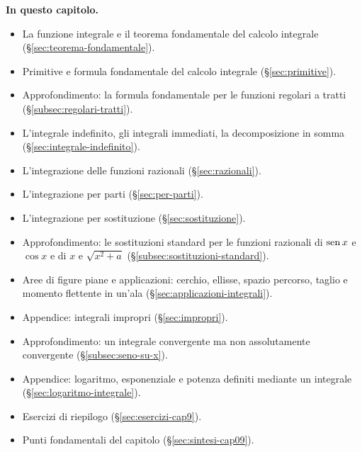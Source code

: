 \medskip
\noindent\textbf{In questo capitolo.}
\begin{itemize}
  \item La funzione integrale e il teorema fondamentale del calcolo integrale
  (\S\ref{sec:teorema-fondamentale}).
  \item Primitive e formula fondamentale del calcolo integrale (\S\ref{sec:primitive}).
  \item Approfondimento: la formula fondamentale per le funzioni regolari a tratti
  (\S\ref{subsec:regolari-tratti}).
  \item L'integrale indefinito, gli integrali immediati, la decomposizione in somma
  (\S\ref{sec:integrale-indefinito}).
  \item L'integrazione delle funzioni razionali (\S\ref{sec:razionali}).
  \item L'integrazione per parti (\S\ref{sec:per-parti}).
  \item L'integrazione per sostituzione (\S\ref{sec:sostituzione}).
  \item Approfondimento: le sostituzioni standard per le funzioni razionali di $\operatorname{sen} x$ e
  $\cos x$ e di $x$ e $\sqrt{x^{2}+a}$ (\S\ref{subsec:sostituzioni-standard}).
  \item Aree di figure piane e applicazioni: cerchio, ellisse, spazio percorso, taglio e
  momento flettente in un'ala (\S\ref{sec:applicazioni-integrali}).
  \item Appendice: integrali impropri (\S\ref{sec:impropri}).
  \item Approfondimento: un integrale convergente ma non assolutamente convergente
  (\S\ref{subsec:seno-su-x}).
  \item Appendice: logaritmo, esponenziale e potenza definiti mediante un integrale
  (\S\ref{sec:logaritmo-integrale}).
  \item Esercizi di riepilogo (\S\ref{sec:esercizi-cap9}).
  \item Punti fondamentali del capitolo (\S\ref{sec:sintesi-cap09}).
\end{itemize}












